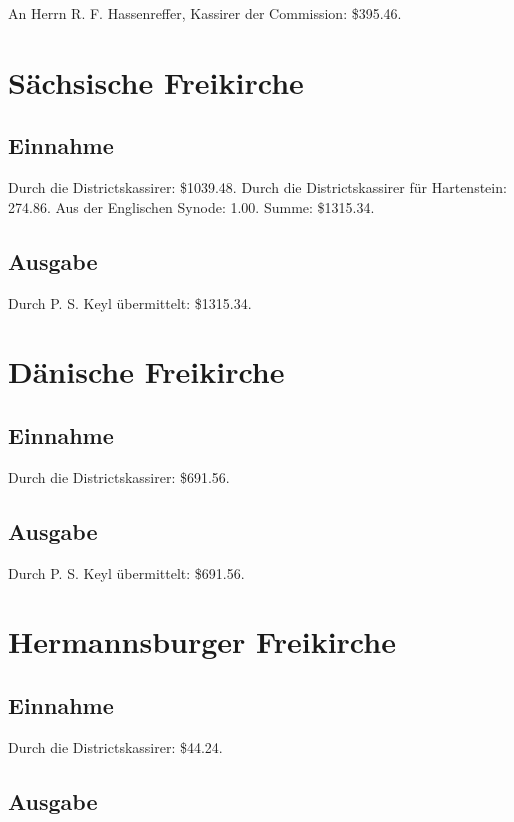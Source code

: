 An Herrn R. F. Hassenreffer, Kassirer der Commission: \$395.46.

\section{Sächsische Freikirche}

\subsection{Einnahme}

Durch die Districtskassirer: \$1039.48. Durch die Districtskassirer für Hartenstein: 274.86. Aus der Englischen Synode: 1.00. Summe: \$1315.34.

\subsection{Ausgabe}

Durch P. S. Keyl übermittelt: \$1315.34.

\section{Dänische Freikirche}

\subsection{Einnahme}

Durch die Districtskassirer: \$691.56.

\subsection{Ausgabe}

Durch P. S. Keyl übermittelt: \$691.56.

\section{Hermannsburger Freikirche}

\subsection{Einnahme}

Durch die Districtskassirer: \$44.24.

\subsection{Ausgabe}

